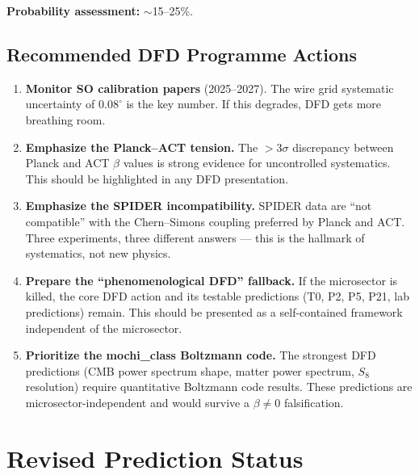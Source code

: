 \documentclass[11pt]{article}
\newcommand{\CS}{Chern--Simons}
\begin{document}
\textbf{Probability assessment:} $\sim$15--25\%.

\subsection{Recommended DFD Programme Actions}

\begin{enumerate}
\item \textbf{Monitor SO calibration papers} (2025--2027).  The wire
  grid systematic uncertainty of $0.08^\circ$ is the key number.
  If this degrades, DFD gets more breathing room.

\item \textbf{Emphasize the Planck--ACT tension.}  The $>3\sigma$
  discrepancy between Planck and ACT $\beta$ values is strong evidence
  for uncontrolled systematics.  This should be highlighted in any
  DFD presentation.

\item \textbf{Emphasize the SPIDER incompatibility.}  SPIDER data
  are ``not compatible'' with the \CS{} coupling preferred by Planck
  and ACT.  Three experiments, three different answers --- this is
  the hallmark of systematics, not new physics.

\item \textbf{Prepare the ``phenomenological DFD'' fallback.}  If
  the microsector is killed, the core DFD action and its testable
  predictions (T0, P2, P5, P21, lab predictions) remain.  This
  should be presented as a self-contained framework independent
  of the microsector.

\item \textbf{Prioritize the mochi\_class Boltzmann code.}  The
  strongest DFD predictions (CMB power spectrum shape, matter
  power spectrum, $S_8$ resolution) require quantitative Boltzmann
  code results.  These predictions are microsector-independent and
  would survive a $\beta \neq 0$ falsification.
\end{enumerate}


\section{Revised Prediction Status}
\label{sec:revised}
\end{document}
